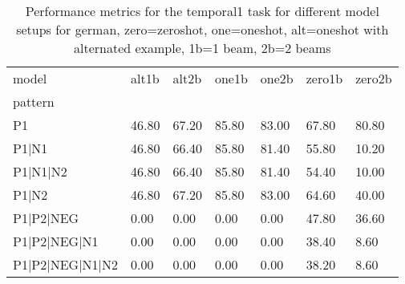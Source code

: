 \begin{table}[h]
\begin{tabular}{l|llllll}
\toprule
model & alt1b & alt2b & one1b & one2b & zero1b & zero2b \\
pattern &  &  &  &  &  &  \\
\midrule
P1 & 46.80 & 67.20 & 85.80 & 83.00 & 67.80 & 80.80 \\
P1|N1 & 46.80 & 66.40 & 85.80 & 81.40 & 55.80 & 10.20 \\
P1|N1|N2 & 46.80 & 66.40 & 85.80 & 81.40 & 54.40 & 10.00 \\
P1|N2 & 46.80 & 67.20 & 85.80 & 83.00 & 64.60 & 40.00 \\
P1|P2|NEG & 0.00 & 0.00 & 0.00 & 0.00 & 47.80 & 36.60 \\
P1|P2|NEG|N1 & 0.00 & 0.00 & 0.00 & 0.00 & 38.40 & 8.60 \\
P1|P2|NEG|N1|N2 & 0.00 & 0.00 & 0.00 & 0.00 & 38.20 & 8.60 \\
\bottomrule
\end{tabular}
\caption{Performance metrics for the temporal1 task for different model setups for german, zero=zeroshot, one=oneshot, alt=oneshot with alternated example, 1b=1 beam, 2b=2 beams}
\label{tab:de_temporal1_performance}
\end{table}
